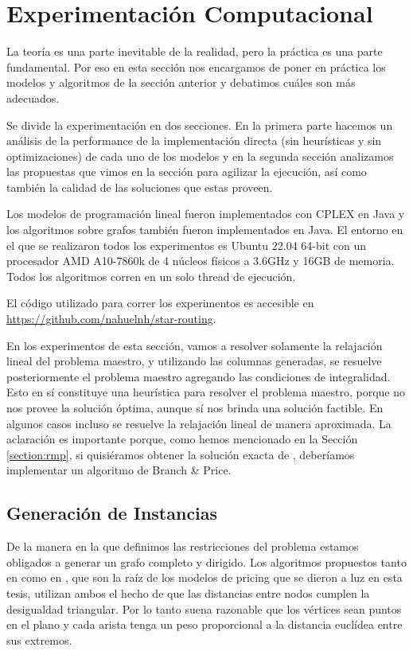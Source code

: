 \chapter{Experimentación Computacional}
\label{ch:experiments}

La teoría es una parte inevitable de la realidad, pero la práctica es una parte fundamental. Por eso en esta sección nos encargamos de poner en práctica los modelos y algoritmos de la sección anterior y debatimos cuáles son más adecuados. 

Se divide la experimentación en dos secciones. En la primera parte hacemos un análisis de la performance de la implementación directa (sin heurísticas y sin optimizaciones) de cada uno de los modelos y en la segunda sección analizamos las propuestas que vimos en la sección \label{ch:algoritmos} para agilizar la ejecución, así como también la calidad de las soluciones que estas proveen.

Los modelos de programación lineal fueron implementados con CPLEX en Java y los algoritmos sobre grafos también fueron implementados en Java. El entorno en el que se realizaron todos los experimentos es Ubuntu 22.04 64-bit con un procesador AMD A10-7860k de 4 núcleos físicos a 3.6GHz y 16GB de memoria. Todos los algoritmos corren en un solo thread de ejecución. 

El código utilizado para correr los experimentos es accesible en \url{https://github.com/nahuelnh/star-routing}.

En los experimentos de esta sección, vamos a resolver solamente la relajación lineal del problema maestro, y utilizando las columnas generadas, se resuelve posteriormente el problema maestro agregando las condiciones de integralidad. Esto en sí constituye una heurística para resolver el problema maestro, porque no nos provee la solución óptima, aunque sí nos brinda una solución factible. En algunos casos incluso se resuelve la relajación lineal de manera aproximada. La aclaración es importante porque, como hemos mencionado en la Sección \ref{section:rmp}, si quisiéramos obtener la solución exacta de , deberíamos implementar un algoritmo de Branch \& Price. 


\section{Generación de Instancias}

De la manera en la que definimos las restricciones del problema estamos obligados a generar un grafo completo y dirigido. Los algoritmos propuestos tanto en \cite{lozano-duque-medaglia} como en \cite{righini-salani}, que son la raíz de los modelos de pricing que se dieron a luz en esta tesis, utilizan ambos el hecho de que las distancias entre nodos cumplen la desigualdad triangular. Por lo tanto suena razonable que los vértices sean puntos en el plano y cada arista tenga un peso proporcional a la distancia euclídea entre sus extremos. 

